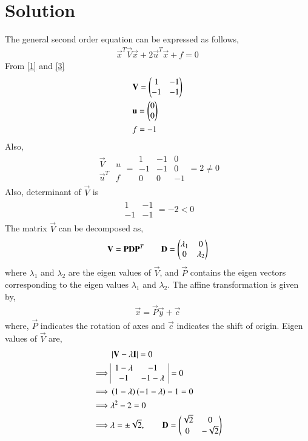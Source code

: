 \documentclass[journal,12pt,twocolumn]{IEEEtran}
\begin{document}
\section{Solution}
The general second order equation can be expressed as follows,
\begin{align}
	\vec{x}^T\vec{V}\vec{x} + 2\vec{u}^T\vec{x} + f = 0 \label{3}
\end{align}
From \eqref{1} and \eqref{3}
\begin{align}
	& \mathbf{V} = \begin{pmatrix}1 & -1 \\ -1 & -1\end{pmatrix} \\ 
	& \mathbf{u} = \begin{pmatrix}0 \\0\end{pmatrix}\\
	& f = -1
\end{align}
Also,
\begin{align}
	\begin{array}{|cc|}
		\vec{V} & u\\ \vec{u}^T & f
	\end{array} = \begin{array}{|ccc|}
	1 & -1 & 0 \\ -1  & -1 &  0 \\ 0 & 0&-1
\end{array}  = 2 \not=0
    \end{align}
Also, determinant of $\vec{V}$ is
\begin{align}
 \begin{array}{|cc|}
 	1 & -1\\ -1 & -1
 \end{array} = -2 < 0
\end{align}
The matrix $\vec{V}$ can be decomposed as,
\begin{align}
	\mathbf V= \mathbf{P}\mathbf{D}\mathbf{P}^T \qquad \mathbf{D} = \begin{pmatrix}\lambda_1 & 0 \\ 0 & \lambda_2\end{pmatrix}
\end{align}
where $\lambda_1$ and $\lambda_2$ are the eigen values of $\vec{V}$, and $\vec{P}$ contains the eigen vectors corresponding to the eigen values $\lambda_1$ and $\lambda_2$. The affine transformation is given by,
\begin{align}
	\vec{x} = \vec{P}\vec{y} + \vec{c}
\end{align}
where, $\vec{P}$ indicates the rotation of axes and $\vec{c}$ indicates the shift of origin.
Eigen values of $\vec{V}$ are,
\begin{align}
	& \left\vert\mathbf{V}-\lambda\mathbf{I}\right\vert = 0 \\
\implies	& \begin{array}{|cc|}
		1-\lambda & -1\\ -1 & -1-\lambda
	\end{array}=0 \\
\implies & \left(1-\lambda\right)\left(-1-\lambda\right) -1 =0\\
\implies &\lambda^2 -2 =0 \\
\implies & \lambda = \pm \sqrt{2}, \qquad \mathbf{D} = \begin{pmatrix}\sqrt{2} &0 \\ 0 & -\sqrt{2}\end{pmatrix} 
\end{align}
\end{document}
